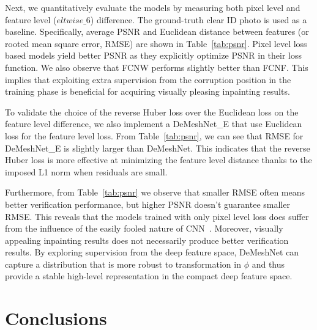 \documentclass[10pt,twocolumn,letterpaper]{article}
\begin{document}
Next, we quantitatively evaluate the models by measuring both pixel level and feature level ($eltwise\_6$) difference. The ground-truth clear ID photo is used as a baseline. Specifically, average PSNR and Euclidean distance between features (or rooted mean square error, RMSE) are shown in Table~\ref{tab:psnr}. Pixel level loss based models yield better PSNR as they explicitly optimize PSNR in their loss function. We also observe that FCNW performs slightly better than FCNF. This implies that exploiting extra supervision from the corruption position in the training phase is beneficial for acquiring visually pleasing inpainting results.

To validate the choice of the reverse Huber loss over the Euclidean loss on the feature level difference, we also implement a DeMeshNet\_E that use Euclidean loss for the feature level loss. From Table~\ref{tab:psnr}, we can see that RMSE for DeMeshNet\_E is slightly larger than DeMeshNet. This indicates that the reverse Huber loss is more effective at minimizing the feature level distance thanks to the imposed L1 norm when residuals are small.

Furthermore, from Table~\ref{tab:psnr} we observe that smaller RMSE often means better verification performance, but higher PSNR doesn't guarantee smaller RMSE. This reveals that the models trained with only pixel level loss does suffer from the influence of the easily fooled nature of CNN~\cite{goodfellow2014explaining,nguyen2015deep,szegedy2013intriguing}. Moreover, visually appealing inpainting results does not necessarily produce better verification results. By exploring supervision from the deep feature space, DeMeshNet can capture a distribution that is more robust to transformation in $\phi$ and thus provide a stable high-level representation in the compact deep feature space.










\section{Conclusions}
\end{document}
